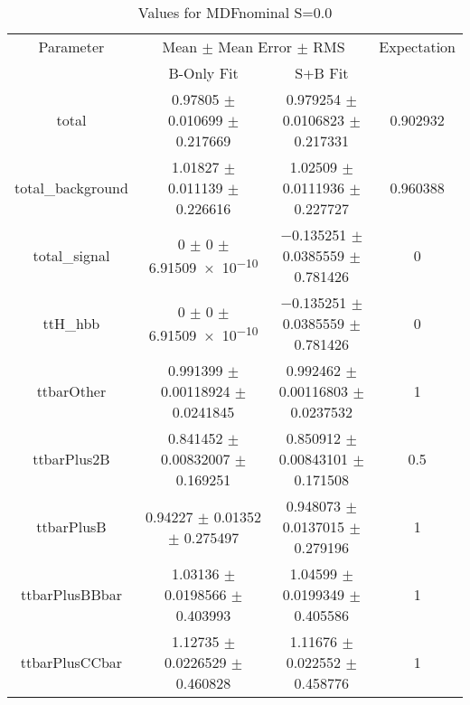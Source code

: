 \begin{table}
\centering
\caption{Values for MDFnominal S=0.0}
\begin{tabular}{cccc}
\toprule
Parameter & \multicolumn{2}{c}{Mean $\pm$ Mean Error $\pm$ RMS} & Expectation\\
 & B-Only Fit & S+B Fit & \\
\midrule
total & \num{0.97805} $\pm$ \num{0.010699} $\pm$ \num{0.217669} & \num{0.979254} $\pm$ \num{0.0106823} $\pm$ \num{0.217331} & \num{0.902932}\\
total\_background & \num{1.01827} $\pm$ \num{0.011139} $\pm$ \num{0.226616} & \num{1.02509} $\pm$ \num{0.0111936} $\pm$ \num{0.227727} & \num{0.960388}\\
total\_signal & \num{0} $\pm$ \num{0} $\pm$ \num{6.91509e-10} & \num{-0.135251} $\pm$ \num{0.0385559} $\pm$ \num{0.781426} & \num{0}\\
ttH\_hbb & \num{0} $\pm$ \num{0} $\pm$ \num{6.91509e-10} & \num{-0.135251} $\pm$ \num{0.0385559} $\pm$ \num{0.781426} & \num{0}\\
ttbarOther & \num{0.991399} $\pm$ \num{0.00118924} $\pm$ \num{0.0241845} & \num{0.992462} $\pm$ \num{0.00116803} $\pm$ \num{0.0237532} & \num{1}\\
ttbarPlus2B & \num{0.841452} $\pm$ \num{0.00832007} $\pm$ \num{0.169251} & \num{0.850912} $\pm$ \num{0.00843101} $\pm$ \num{0.171508} & \num{0.5}\\
ttbarPlusB & \num{0.94227} $\pm$ \num{0.01352} $\pm$ \num{0.275497} & \num{0.948073} $\pm$ \num{0.0137015} $\pm$ \num{0.279196} & \num{1}\\
ttbarPlusBBbar & \num{1.03136} $\pm$ \num{0.0198566} $\pm$ \num{0.403993} & \num{1.04599} $\pm$ \num{0.0199349} $\pm$ \num{0.405586} & \num{1}\\
ttbarPlusCCbar & \num{1.12735} $\pm$ \num{0.0226529} $\pm$ \num{0.460828} & \num{1.11676} $\pm$ \num{0.022552} $\pm$ \num{0.458776} & \num{1}\\
\bottomrule
\end{tabular}
\end{table}